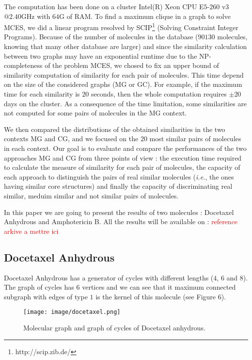 \documentclass[journal=jacsat,manuscript=article]{achemso}
\begin{document}
The computation has been done on a cluster Intel(R) Xeon CPU E$5$-$260$ v$3$ $@ 2.40$GHz with $64$G of RAM. To find a maximum clique in a graph to solve MCES, we did a linear program resolved by SCIP\footnote{http://scip.zib.de/} (Solving Constraint Integer Programs).  Because of the number of molecules in the database ($90 130$ molecules, knowing that many other database are larger) and since the similarity calculation between two graphs may have an exponential runtime due to the NP-completeness of the problem MCES, we chosed to fix an upper bound of similarity computation of similarity for each pair of molecules. This time depend on the size of the considered graphs (MG or GC). For example, if the maximum time for each similarity is $20$ seconds, then the whole computation requires $\pm20$ days on the cluster. As a consequence of the time limitation, some similarities are not computed for some pairs of molecules in the MG context. 
 
  
We then compared the distributions of the obtained similarities in the two contexts MG and CG, and we focused on the $20$ most similar pairs of molecules in each context. Our goal is to evaluate and compare the performances of the two approaches  MG and CG  from three points of view : the execution time required to calculate the measure of similarity for each pair of molecules, the capacity of each approach to distinguish the pairs of real similar molecules (\textit{i.e.}, the ones having similar core structures) and finally the capacity of discriminating real similar, meduim similar and not similar pairs of molecules. 

In this paper we are going to present the results of two molecules : Docetaxel Anhydrous and Amphotericin B. All the results will be available on : \textcolor{red}{reference arkive a mettre ici} 

\subsection{Docetaxel Anhydrous}
 
Docetaxel Anhydrous has a generator of cycles with different lengths ($4$, $6$ and $8$). The graph of cycles has $6$ vertices and we can see that it maximum connected subgraph with edges of type $1$  is the kernel of this molecule (see Figure $6$). 
 
\begin{figure}[H]
 \label{docetaxel}
 \begin{center}
\texttt{[image: image/docetaxel.png]}
\end{center}
\caption{Molecular graph and graph of cycles of Docetaxel anhydrous. }
 \end{figure}
 
\end{document}
